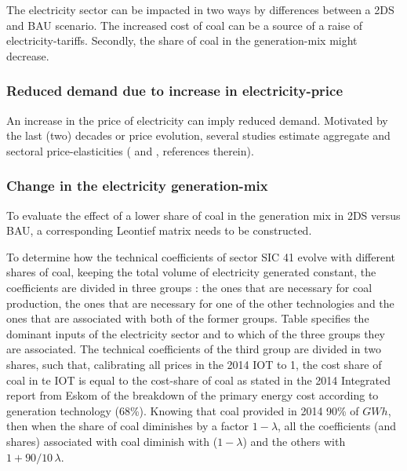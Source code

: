 \documentclass[12pt,english]{article}
\begin{document}
The electricity sector can be impacted in two ways by differences between a 2DS and BAU scenario. The increased cost of coal can be a source of a raise of electricity-tariffs. Secondly, the share of coal in the generation-mix might decrease.

\subsubsection{Reduced demand due to increase in electricity-price}

An increase in the price of electricity can imply reduced demand. Motivated by the last (two) decades or price evolution, several studies estimate aggregate and sectoral price-elasticities (\cite{inglesi2010forecasting} and \cite{goliger2018electricity}, references therein). 


\subsubsection{Change in the electricity generation-mix}


To evaluate the effect of a lower share of coal in the generation mix in 2DS versus BAU, a corresponding Leontief matrix needs to be constructed. 

To determine how the technical coefficients of sector SIC 41 evolve with different shares of coal, keeping the total volume of electricity generated constant, the coefficients are divided in three groups : the ones that are necessary for coal production, the ones that are necessary for one of the other technologies and the ones that are associated with both of the former groups. %
Table \label{GenerationMixcoefficients} specifies the dominant inputs of the electricity sector and to which of the three groups they are associated. The technical coefficients of the third group are divided in two shares, such that, calibrating all prices in the 2014 IOT to 1, the cost share of coal in te IOT is equal to the cost-share of coal as stated in the 2014 Integrated report from Eskom of the breakdown of the primary energy cost according to generation technology (68\%). Knowing that coal provided in 2014 90\% of $GWh$, then when the share of coal diminishes by a factor $1 - \lambda$, all the coefficients (and shares) associated with coal diminish with ($1-\lambda$) and the others with $1 + 90/10 \, \lambda$.
\end{document}
